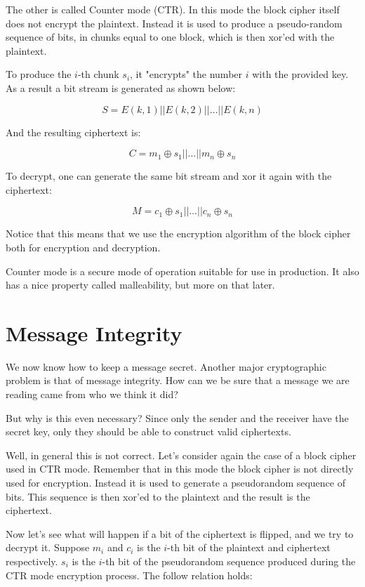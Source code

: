 The other is called Counter mode (CTR).
In this mode the block cipher itself does not encrypt the plaintext.
Instead it is used to produce a pseudo-random sequence of bits, in chunks equal to one block, which is then xor'ed with the plaintext.

To produce the $i$-th chunk $s_i$, it "encrypts" the number $i$ with the provided key.
As a result a bit stream is generated as shown below:

\[
  S = E(k, 1) || E(k, 2) || \dots || E(k, n)
\]

And the resulting ciphertext is:

\[
  C = m_1 \oplus s_1 || \dots || m_n \oplus s_n
\]

To decrypt, one can generate the same bit stream and xor it again with the ciphertext:

\[
  M = c_1 \oplus s_1 || \dots || c_n \oplus s_n
\]

Notice that this means that we use the encryption algorithm of the block cipher both for encryption and decryption.

Counter mode is a secure mode of operation suitable for use in production.
It also has a nice property called malleability, but more on that later.


\section{Message Integrity}

We now know how to keep a message secret.
Another major cryptographic problem is that of message integrity.
How can we be sure that a message we are reading came from who we think it did?

But why is this even necessary?
Since only the sender and the receiver have the secret key, only they should be able to construct valid ciphertexts.

Well, in general this is not correct.
Let's consider again the case of a block cipher used in CTR mode.
Remember that in this mode the block cipher is not directly used for encryption.
Instead it is used to generate a pseudorandom sequence of bits.
This sequence is then xor'ed to the plaintext and the result is the ciphertext.

Now let's see what will happen if a bit of the ciphertext is flipped, and we try to decrypt it.
Suppose $m_i$ and $c_i$ is the $i$-th bit of the plaintext and ciphertext respectively. $s_i$ is the $i$-th bit of the pseudorandom sequence produced during the CTR mode encryption process.
The follow relation holds:

